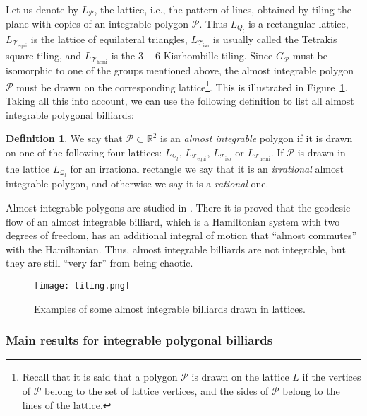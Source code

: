 \documentclass{amsart}
\theoremstyle{definition}
\newtheorem{definition}[theorem]{Definition}
\theoremstyle{remark}
\def\RR{\mathbb{R}}
\numberwithin{equation}{section}
\theoremstyle{definition}
\theoremstyle{remark}
\def\RR{\mathbb{R}}
\begin{document}
Let us denote by $L_{\mathcal{P}}$, the lattice, i.e., the pattern of lines, obtained by tiling the plane with copies of an integrable polygon $\mathcal{P}$. Thus $L_{Q_{l}}$ is a rectangular lattice, $L_{\mathcal{T}_{\mathrm{equi}}}$ is the lattice of equilateral triangles, $L_{\mathcal{T}_{\mathrm{iso}}}$ is usually called the Tetrakis square tiling, and  $L_{\mathcal{T}_{\mathrm{hemi}}}$ is the $3-6$ Kisrhombille tiling. Since $G_\mathcal{P}$ must be isomorphic to one of the groups mentioned above, the almost integrable polygon $\mathcal{P}$ must be drawn on the corresponding lattice\footnote{Recall that it is said that a polygon $\mathcal{P}$ is drawn on the lattice $L$ if the vertices of $\mathcal{P}$ belong to the set of lattice vertices, and the sides of $\mathcal{P}$ belong to the lines of the lattice.}. This is illustrated in Figure~\ref{F.ai}. Taking all this into account, we can use the following definition to list all almost integrable polygonal billiards:

\begin{definition}\label{ai}
	We say that $\mathcal{P}\subset\RR^2$ is an {\em almost integrable}\/ polygon if it is drawn on one of the following four lattices: $L_{\mathcal{Q}_{l}}$, $L_{\mathcal{T}_{\mathrm{equi}}}$, $L_{\mathcal{T}_{\mathrm{iso}}}$ or $L_{\mathcal{T}_{\mathrm{hemi}}}$.
	If $\mathcal{P}$ is drawn in the lattice $L_{\mathcal{Q}_{l}}$ for an irrational rectangle  we say that it is an {\em irrational}\/ almost integrable polygon, and otherwise we say it is a {\em rational}\/ one.
\end{definition}

Almost integrable polygons are studied in \cite{GutkinII}. There it is proved that the geodesic flow of an almost integrable billiard, which is a Hamiltonian
system with two degrees of freedom, has an additional integral of motion that ``almost commutes'' with the Hamiltonian. Thus, almost integrable billiards are not integrable, but they are still ``very far'' from being chaotic.

\begin{figure}\label{F.ai}\renewcommand\thefigure{2}
	\texttt{[image: tiling.png]}
	\caption{Examples of some almost integrable billiards drawn in lattices.}
\end{figure}



\subsubsection{Main results for integrable polygonal billiards}
\end{document}
